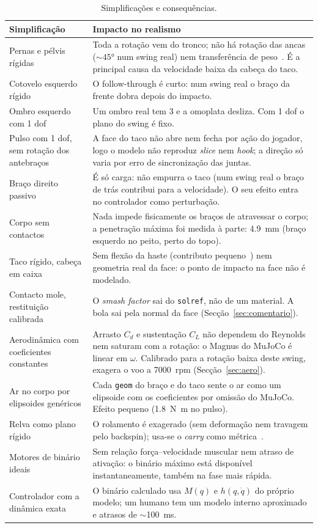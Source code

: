 \documentclass[11pt,a4paper]{article}
\begin{document}
\begin{table}[htbp]
\centering
\caption{Simplificações e consequências.}
\label{tab:simpl}
\small
\begin{tabularx}{\textwidth}{@{}>{\raggedright\arraybackslash}p{4.6cm}X@{}}
\toprule
Simplificação & Impacto no realismo \\
\midrule
Pernas e pélvis rígidas &
Toda a rotação vem do tronco; não há rotação das ancas ($\sim\ang{45}$ num swing
real) nem transferência de peso~\cite{hume2005}. É a principal causa da
velocidade baixa da cabeça do taco. \\
Cotovelo esquerdo rígido &
O follow-through é curto: num swing real o braço da frente dobra depois do
impacto. \\
Ombro esquerdo com 1 dof &
Um ombro real tem 3 e a omoplata desliza. Com 1 dof o plano do swing é fixo. \\
Pulso com 1 dof, sem rotação dos antebraços &
A face do taco não abre nem fecha por ação do jogador, logo o modelo não
reproduz \emph{slice} nem \emph{hook}; a direção só varia por erro de
sincronização das juntas. \\
Braço direito passivo &
É só carga: não empurra o taco (num swing real o braço de trás contribui para
a velocidade). O seu efeito entra no controlador como perturbação. \\
Corpo sem contactos &
Nada impede fisicamente os braços de atravessar o corpo; a penetração máxima
foi medida à parte: \SI{4.9}{\milli\meter} (braço esquerdo no peito, perto do
topo). \\
Taco rígido, cabeça em caixa &
Sem flexão da haste (contributo pequeno~\cite{milne1992}) nem geometria real
da face: o ponto de impacto na face não é modelado. \\
Contacto mole, restituição calibrada &
O \emph{smash factor} sai do \texttt{solref}, não de um material. A bola sai
pela normal da face (Secção~\ref{sec:comentario}). \\
Aerodinâmica com coeficientes constantes &
Arrasto $C_d$ e sustentação $C_L$ não dependem do Reynolds nem saturam com a
rotação: o Magnus do MuJoCo é linear em $\omega$. Calibrado para a rotação
baixa deste swing, exagera o voo a 7000~rpm (Secção~\ref{sec:aero}). \\
Ar no corpo por elipsoides genéricos &
Cada \texttt{geom} do braço e do taco sente o ar como um elipsoide com os
coeficientes por omissão do MuJoCo. Efeito pequeno (\SI{1.8}{\newton\meter} no
pulso). \\
Relva como plano rígido &
O rolamento é exagerado (sem deformação nem travagem pelo backspin); usa-se o
\emph{carry} como métrica~\cite{penner2002}. \\
Motores de binário ideais &
Sem relação força--velocidade muscular nem atraso de ativação: o binário máximo
está disponível instantaneamente, também na fase mais rápida. \\
Controlador com a dinâmica exata &
O binário calculado usa $M(q)$ e $h(q,\dot q)$ do próprio modelo; um humano tem
um modelo interno aproximado e atrasos de $\sim$\SI{100}{\milli\second}. \\
\bottomrule
\end{tabularx}
\end{table}
\end{document}
